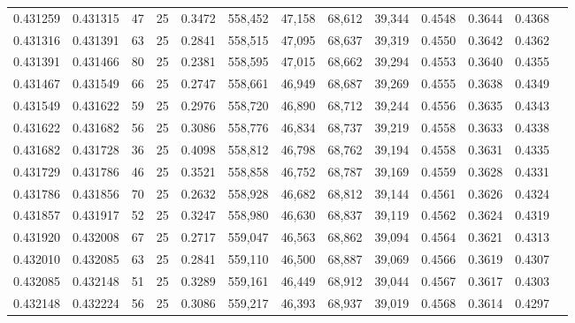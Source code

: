 \begin{tabular}{rrrrrrrrrrrrr}
0.431259 & 0.431315 &    47 &  25 &                                     0.3472 & 558,452 &  47,158 &  68,612 &  39,344 & 0.4548 & 0.3644 & 0.4368 \\
0.431316 & 0.431391 &    63 &  25 &                                     0.2841 & 558,515 &  47,095 &  68,637 &  39,319 & 0.4550 & 0.3642 & 0.4362 \\
0.431391 & 0.431466 &    80 &  25 &                                     0.2381 & 558,595 &  47,015 &  68,662 &  39,294 & 0.4553 & 0.3640 & 0.4355 \\
0.431467 & 0.431549 &    66 &  25 &                                     0.2747 & 558,661 &  46,949 &  68,687 &  39,269 & 0.4555 & 0.3638 & 0.4349 \\
0.431549 & 0.431622 &    59 &  25 &                                     0.2976 & 558,720 &  46,890 &  68,712 &  39,244 & 0.4556 & 0.3635 & 0.4343 \\
0.431622 & 0.431682 &    56 &  25 &                                     0.3086 & 558,776 &  46,834 &  68,737 &  39,219 & 0.4558 & 0.3633 & 0.4338 \\
0.431682 & 0.431728 &    36 &  25 &                                     0.4098 & 558,812 &  46,798 &  68,762 &  39,194 & 0.4558 & 0.3631 & 0.4335 \\
0.431729 & 0.431786 &    46 &  25 &                                     0.3521 & 558,858 &  46,752 &  68,787 &  39,169 & 0.4559 & 0.3628 & 0.4331 \\
0.431786 & 0.431856 &    70 &  25 &                                     0.2632 & 558,928 &  46,682 &  68,812 &  39,144 & 0.4561 & 0.3626 & 0.4324 \\
0.431857 & 0.431917 &    52 &  25 &                                     0.3247 & 558,980 &  46,630 &  68,837 &  39,119 & 0.4562 & 0.3624 & 0.4319 \\
0.431920 & 0.432008 &    67 &  25 &                                     0.2717 & 559,047 &  46,563 &  68,862 &  39,094 & 0.4564 & 0.3621 & 0.4313 \\
0.432010 & 0.432085 &    63 &  25 &                                     0.2841 & 559,110 &  46,500 &  68,887 &  39,069 & 0.4566 & 0.3619 & 0.4307 \\
0.432085 & 0.432148 &    51 &  25 &                                     0.3289 & 559,161 &  46,449 &  68,912 &  39,044 & 0.4567 & 0.3617 & 0.4303 \\
0.432148 & 0.432224 &    56 &  25 &                                     0.3086 & 559,217 &  46,393 &  68,937 &  39,019 & 0.4568 & 0.3614 & 0.4297 \\

\end{tabular}
